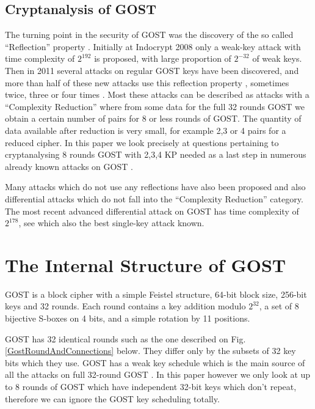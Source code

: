 \subsection{Cryptanalysis of GOST}

The turning point in the security of GOST was the discovery of the so called
``Reflection'' property \cite{GOSTReflectionKara}.
Initially at Indocrypt 2008 only a weak-key attack with time complexity of $2^{192}$
is proposed, with large proportion of $2^{-32}$ of weak keys.
Then in 2011 several attacks on regular GOST keys have been discovered,
and more than half of these new attacks use this reflection property \cite{JapaneseGOSTMITMFSE2011,DunkelmanImprovedGOST8R}, sometimes twice, three or four times \cite{gostac}.
Most these attacks can be described as attacks with a ``Complexity Reduction''
\cite{gostreport,gostac} where from
some data for the full 32 rounds GOST we obtain a certain number
of pairs for 8 or less rounds of GOST.
The quantity of data available after reduction is very small,
for example 2,3 or 4 pairs for a reduced cipher.
In this paper we look precisely at questions
pertaining to cryptanalysing 8 rounds GOST with 2,3,4 KP
needed as a last step in numerous already known attacks on GOST
\cite{gostreport,gostac,gostlow8r}.

Many attacks which do not use any reflections
have also been proposed \cite{gostac,gostreport,DunkelmanImprovedGOST8R}
and also differential attacks which do not
fall into the ``Complexity Reduction'' category.
The most recent advanced differential attack on GOST
has time complexity of $2^{178}$, see \cite{gostdc0,gostdc2}
which also the best single-key attack known.

\section{The Internal Structure of GOST}
GOST is a block cipher with a simple Feistel structure,
64-bit block size, 256-bit keys and 32 rounds.
Each round contains a key addition modulo $2^{32}$,
a set of 8 bijective S-boxes on 4 bits,
and a simple rotation by 11 positions.

GOST has 32 identical rounds such as the one described on Fig. \ref{GostRoundAndConnections} below.
They differ only by the subsets of 32 key bits which they use. GOST has a weak key schedule which is the main source of all the attacks on full 32-round GOST \cite{gostreport,gostac,JapaneseGOSTMITMFSE2011,gostdcpp1,gostdc0,gostdc1,gostdc2,DunkelmanImprovedGOST8R}. 
In this paper however we only look at up to 8 rounds of GOST which have independent 32-bit keys which don't repeat, therefore we can ignore the GOST key scheduling totally.

